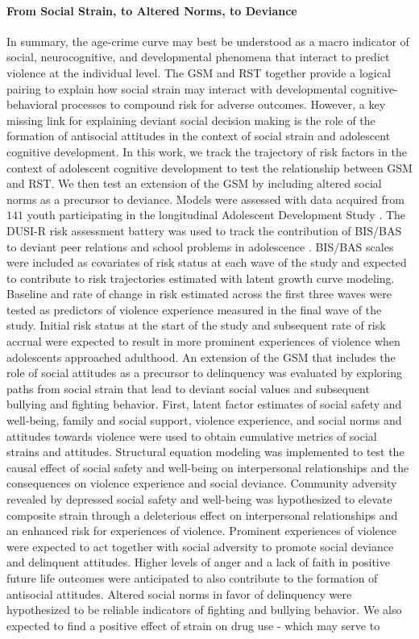 \documentclass[utf8]{article}
\begin{document}
\paragraph{From Social Strain, to Altered Norms, to Deviance} In summary, the age-crime curve may best be understood as a macro indicator of social, neurocognitive, and developmental phenomena that interact to predict violence at the individual level. The GSM and RST together provide a logical pairing to explain how social strain may interact with developmental cognitive-behavioral processes to compound risk for adverse outcomes. However, a key missing link for explaining deviant social decision making is the role of the formation of antisocial attitudes in the context of social strain and adolescent cognitive development. In this work, we track the trajectory of risk factors in the context of adolescent cognitive development to test the relationship between GSM and RST. We then test an extension of the GSM by including altered social norms as a precursor to deviance. Models were assessed with data acquired from $141$ youth participating in the longitudinal Adolescent Development Study \citep{Fishbein2016}. The DUSI-R risk assessment battery was used to track the contribution of BIS/BAS to deviant peer relations and school problems in adolescence \citep{tarter1994reliability}. BIS/BAS scales were included as covariates of risk status at each wave of the study and expected to contribute to risk trajectories estimated with latent growth curve modeling. Baseline and rate of change in risk estimated across the first three waves were tested as predictors of violence experience measured in the final wave of the study. Initial risk status at the start of the study and subsequent rate of risk accrual were expected to result in more prominent experiences of violence when adolescents approached adulthood. An extension of the GSM that includes the role of social attitudes as a precursor to delinquency was evaluated by exploring paths from social strain that lead to deviant social values and subsequent bullying and fighting behavior. First, latent factor estimates of social safety and well-being, family and social support, violence experience, and social norms and attitudes towards violence were used to obtain cumulative metrics of social strains and attitudes. Structural equation modeling was implemented to test the causal effect of social safety and well-being on interpersonal relationships and the consequences on violence experience and social deviance. Community adversity revealed by depressed social safety and well-being was hypothesized to elevate composite strain through a deleterious effect on interpersonal relationships and an enhanced risk for experiences of violence. Prominent experiences of violence were expected to act together with social adversity to promote social deviance and delinquent attitudes.  Higher levels of anger and a lack of faith in positive future life outcomes were anticipated to also contribute to the formation of antisocial attitudes. Altered social norms in favor of  delinquency were hypothesized to be reliable indicators of fighting and bullying behavior. We also expected to find a positive effect of strain on drug use - which may serve to 
\end{document}
